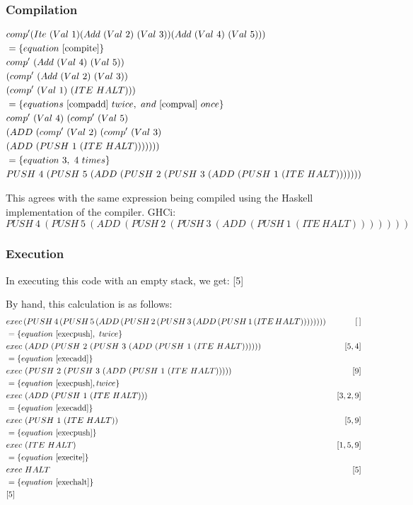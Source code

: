 \documentclass {article}
\begin{document}
\subsubsection{Compilation}

\begin{align*}
	&comp' (Ite\
			(Val\ 1)
			(Add\ (Val\ 2)\ (Val\ 3))
			(Add\ (Val\ 4)\ (Val\ 5))) \\
	&= \{ equation\ \ref{compite} \}\ \\ 
	&comp'\ (Add\ (Val\ 4)\ (Val\ 5))\\
		&(comp'\ (Add\ (Val\ 2)\ (Val\ 3))\\
			&(comp'\ (Val\ 1)\ (ITE\  HALT))) \\
	&= \{ equations\ \ref{compadd}\ twice,\ and\ \ref{compval}\ once\} \\
	&comp'\ (Val\ 4)\ 
		(comp'\ (Val\ 5)\ \\
				&(ADD\ (comp'\ (Val\ 2)\ 
						(comp'\ (Val\ 3)\ \\
							&(ADD\ (PUSH\ 1\ 
								(ITE\ HALT))))))) \\
	&= \{equation\ 3,\ 4\ times \} \\
	&PUSH\ 4\ (PUSH\ 5\ 
		(ADD\ (PUSH\ 2\ (PUSH\ 3\ 
			(ADD\ (PUSH\ 1\ (ITE\ HALT)))))))
\end{align*}

This agrees with the same expression being compiled
using the Haskell implementation of the compiler.
GHCi:
\[ PUSH\ 4\ (PUSH\ 5\
	(ADD\ (PUSH\ 2\ (PUSH\ 3\ 
		(ADD\ (PUSH\ 1\ (ITE\ HALT))))))) \]
	
\subsubsection{Execution}

In executing this code with an empty stack, we get: [5]

By hand, this calculation is as follows:
\begin{align*}
	&exec \, (PUSH \, 4\, (PUSH \, 5\, 
			(ADD\, (PUSH \, 2\, (PUSH \, 3\, 
			(ADD\, (PUSH \, 1\, (ITE\, HALT))))))))\ &[\, ] \\
	&= \{equation\ \ref{execpush},\ twice\} \\ 
	&exec\ (ADD\ (PUSH\ 2\ (PUSH\ 3\ 
			(ADD\ (PUSH\ 1\ (ITE\ HALT))))))\ &[5,4] \\
	&= \{equation\ \ref{execadd}\} \\
	&exec\ (PUSH\ 2\ (PUSH\ 3\ 
			(ADD\ (PUSH\ 1\ (ITE\ HALT)))))\ &[9] \\
	&= \{equation\ \ref{execpush}, twice\} \\ 
	&exec\ (ADD\ (PUSH\ 1\ (ITE\ HALT)))\ &[3, 2, 9] \\
	&= \{equation\ \ref{execadd}\} \\
	&exec\ (PUSH\ 1\ (ITE\ HALT))\ &[5, 9] \\
	&= \{equation\ \ref{execpush}\} \\
	&exec\ (ITE\ HALT) &[1, 5, 9] \\
	&= \{equation\ \ref{execite}\} \\
	&exec\ HALT\ &[5] \\
	&= \{equation\ \ref{exechalt}\} \\
	&[5]
\end{align*}
\end{document}
